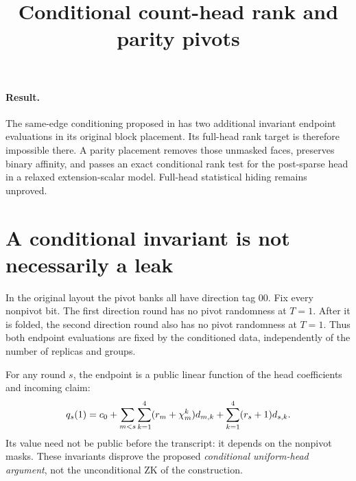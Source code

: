 \documentclass[11pt]{article}
\title{Conditional count-head rank and parity pivots}
\author{}
\date{}
\begin{document}
\maketitle
\vspace{-2em}

\paragraph{Result.} The same-edge conditioning proposed in  has two additional invariant endpoint evaluations in its original block placement. Its full-head rank target is therefore impossible there. A parity placement removes those unmasked faces, preserves binary affinity, and passes an exact conditional rank test for the post-sparse head in a relaxed extension-scalar model. Full-head statistical hiding remains unproved.

\section{A conditional invariant is not necessarily a leak}

In the original layout the pivot banks all have direction tag $00$. Fix every nonpivot bit. The first direction round has no pivot randomness at $T=1$. After it is folded, the second direction round also has no pivot randomness at $T=1$. Thus both endpoint evaluations are fixed by the conditioned data, independently of the number of replicas and groups.

For any round $s$, the endpoint is a public linear function of the head coefficients and incoming claim:
\[
 q_s(1)=c_0+
 \sum_{m<s}\sum_{k=1}^4(r_m+\chi_m^k)d_{m,k}
 +\sum_{k=1}^4(r_s+1)d_{s,k}.
\]
Its value need not be public before the transcript: it depends on the nonpivot masks. These invariants disprove the proposed \emph{conditional uniform-head argument}, not the unconditional ZK of the construction.
\end{document}
